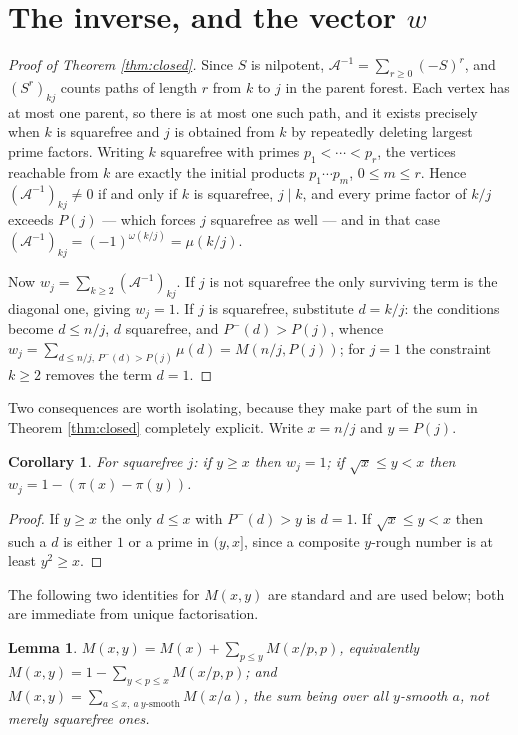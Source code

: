 \documentclass[11pt]{article}
\newtheorem{lemma}[theorem]{Lemma}
\newtheorem{corollary}[theorem]{Corollary}
\theoremstyle{definition}
\theoremstyle{remark}
\newcommand{\Ac}{\mathcal{A}}
\newcommand{\Pp}{P}
\newcommand{\Pm}{P^{-}}
\begin{document}
\section{The inverse, and the vector \texorpdfstring{$w$}{w}}\label{sec:closed}

\begin{proof}[Proof of Theorem \ref{thm:closed}]
Since $S$ is nilpotent, $\Ac^{-1}=\sum_{r\ge0}(-S)^r$, and $(S^r)_{kj}$ counts
paths of length $r$ from $k$ to $j$ in the parent forest. Each vertex has at most
one parent, so there is at most one such path, and it exists precisely when $k$ is
squarefree and $j$ is obtained from $k$ by repeatedly deleting largest prime
factors. Writing $k$ squarefree with primes $p_1<\cdots<p_r$, the vertices
reachable from $k$ are exactly the initial products $p_1\cdots p_m$,
$0\le m\le r$. Hence $(\Ac^{-1})_{kj}\ne0$ if and only if $k$ is squarefree,
$j\mid k$, and every prime factor of $k/j$ exceeds $\Pp(j)$ --- which forces $j$
squarefree as well --- and in that case $(\Ac^{-1})_{kj}=(-1)^{\omega(k/j)}=\mu(k/j)$.

Now $w_j=\sum_{k\ge2}(\Ac^{-1})_{kj}$. If $j$ is not squarefree the only surviving
term is the diagonal one, giving $w_j=1$. If $j$ is squarefree, substitute
$d=k/j$: the conditions become $d\le n/j$, $d$ squarefree, and $\Pm(d)>\Pp(j)$,
whence $w_j=\sum_{d\le n/j,\,\Pm(d)>\Pp(j)}\mu(d)=M(n/j,\Pp(j))$; for $j=1$ the
constraint $k\ge2$ removes the term $d=1$.
\end{proof}

Two consequences are worth isolating, because they make part of the sum in
Theorem \ref{thm:closed} completely explicit. Write $x=n/j$ and $y=\Pp(j)$.

\begin{corollary}\label{cor:trichotomy}
For squarefree $j$: if $y\ge x$ then $w_j=1$; if $\sqrt x\le y<x$ then
$w_j = 1-(\pi(x)-\pi(y))$.
\end{corollary}

\begin{proof}
If $y\ge x$ the only $d\le x$ with $\Pm(d)>y$ is $d=1$. If $\sqrt x\le y<x$ then
such a $d$ is either $1$ or a prime in $(y,x]$, since a composite $y$-rough number
is at least $y^2\ge x$.
\end{proof}

The following two identities for $M(x,y)$ are standard and are used below; both
are immediate from unique factorisation.

\begin{lemma}\label{lem:identities}
$M(x,y)=M(x)+\sum_{p\le y}M(x/p,p)$, equivalently $M(x,y)=1-\sum_{y<p\le
x}M(x/p,p)$; and $M(x,y)=\sum_{a\le x,\ a\ y\text{-smooth}}M(x/a)$, the sum being
over \emph{all} $y$-smooth $a$, not merely squarefree ones.
\end{lemma}
\end{document}
